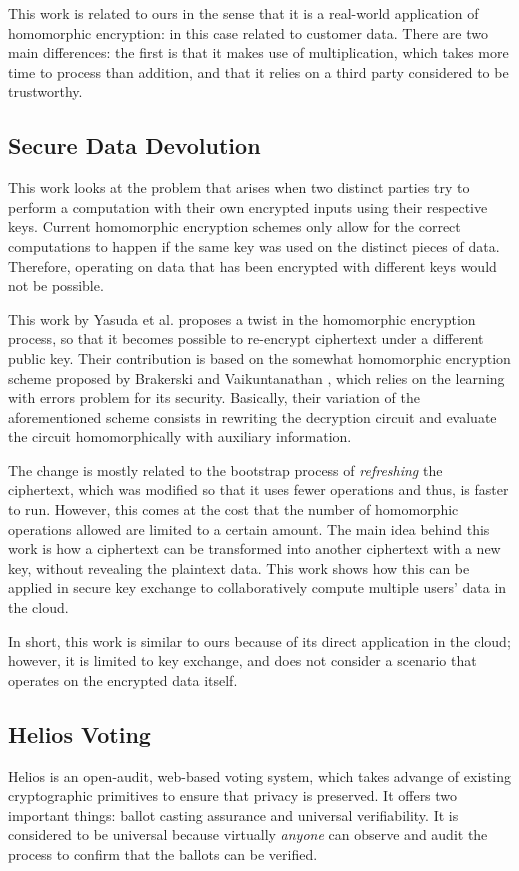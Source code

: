 This work is related to ours in the sense that it is a real-world application of homomorphic encryption: in this case related to customer data. There are two main differences: the first is that it makes use of multiplication, which takes more time to process than addition, and that it relies on a third party considered to be trustworthy. 

\subsection{Secure Data Devolution}
This work looks at the problem that arises when two distinct parties try to perform a computation with their own encrypted inputs using their respective keys. Current homomorphic encryption schemes only allow for the correct computations to happen if the same key was used on the distinct pieces of data. Therefore, operating on data that has been encrypted with different keys would not be possible. 

This work by Yasuda et al. \cite{Yasuda:2015:SDD:2732516.2732521} proposes a twist in the homomorphic encryption process, so that it becomes possible to re-encrypt ciphertext under a different public key. Their contribution is based on the somewhat homomorphic encryption scheme proposed by  Brakerski and Vaikuntanathan \cite{cryptoeprint:2011:277}, which relies on the learning with errors problem for its security.  Basically, their variation of the aforementioned scheme consists in rewriting the decryption circuit and evaluate the circuit homomorphically with auxiliary information.

The change is mostly related to the bootstrap process of \emph{refreshing} the ciphertext, which was modified so that it uses fewer operations and thus, is faster to run. However, this comes at the cost that the number of homomorphic operations allowed are limited to a certain amount. The main idea behind this work is how a ciphertext can be transformed into another ciphertext with a new key, without revealing the plaintext data. This work shows how this can be applied in secure key exchange to collaboratively compute multiple users' data in the cloud.

In short, this work is similar to ours because of its direct application in the cloud; however, it is limited to key exchange, and does not consider a scenario that operates on the encrypted data itself.

\subsection{{Helios Voting}}
Helios \cite{adida2008helios} is an open-audit, web-based voting system, which takes advange of existing cryptographic primitives to ensure that privacy is preserved. It offers two important things: ballot casting assurance and universal verifiability. It is considered to be universal because virtually \emph{anyone} can observe and audit the process to confirm that the ballots can be verified.

